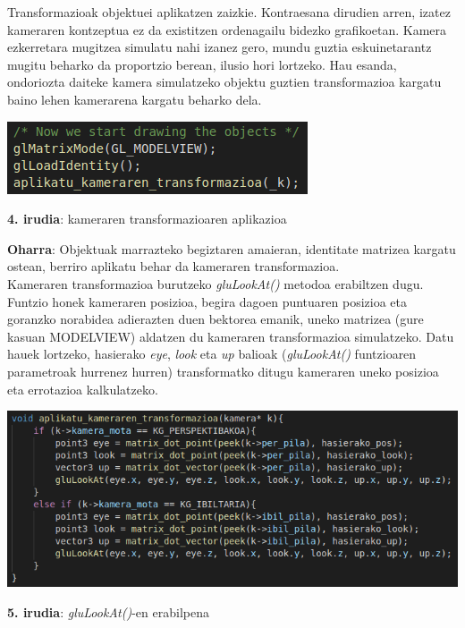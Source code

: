 \documentclass[12pt]{article}
\newcommand{\metodo}[1] {\textit{#1}}
\newcommand{\aldagai}[1] {\textit{#1}}
\begin{document}
Transformazioak objektuei aplikatzen zaizkie. Kontraesana dirudien arren, izatez kameraren kontzeptua ez da existitzen ordenagailu bidezko grafikoetan. Kamera ezkerretara mugitzea simulatu nahi izanez gero, mundu guztia eskuinetarantz mugitu beharko da proportzio berean, ilusio hori lortzeko. Hau esanda, ondoriozta daiteke kamera simulatzeko objektu guztien transformazioa kargatu baino lehen kamerarena kargatu beharko dela.

\begin{center}
\includegraphics[scale=0.7]{kamera_transform.png}

\textbf{4. irudia}: kameraren transformazioaren aplikazioa
\end{center}

\textbf{Oharra}: Objektuak marrazteko begiztaren amaieran, identitate matrizea kargatu ostean, berriro aplikatu behar da kameraren transformazioa.\\

Kameraren transformazioa burutzeko \metodo{gluLookAt()}\cite{glu_lookat} metodoa erabiltzen dugu. Funtzio honek kameraren posizioa, begira dagoen puntuaren posizioa eta goranzko norabidea adierazten duen bektorea emanik, uneko matrizea (gure kasuan MODELVIEW) aldatzen du kameraren transformazioa simulatzeko. Datu hauek lortzeko, hasierako \aldagai{eye}, \aldagai{look} eta \aldagai{up} balioak (\metodo{gluLookAt()} funtzioaren parametroak hurrenez hurren) transformatko ditugu kameraren uneko posizioa eta errotazioa kalkulatzeko.

\begin{center}
\includegraphics[scale=0.6]{kamera_lookat.png}

\textbf{5. irudia}: \metodo{gluLookAt()}-en erabilpena
\end{center}
\end{document}
